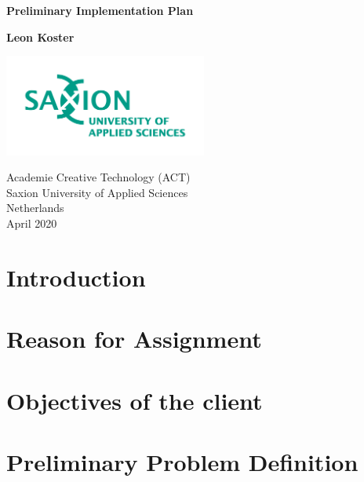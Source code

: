 \documentclass[]{article}
\begin{document}
\begin{titlepage}
   \begin{center}
       \vspace*{1cm}

       \textbf{Preliminary Implementation Plan}

       \vspace{0.5cm}
            
       \vspace{1.5cm}

       \textbf{Leon Koster}

       \vfill
            
       \vspace{0.8cm}
     
      \includegraphics[width=0.5\textwidth]{university}
            
       Academie Creative Technology (ACT)\\
       Saxion University of Applied Sciences\\
       Netherlands\\
       April 2020
            
   \end{center}
\end{titlepage}

\section{Introduction}
\section{Reason for Assignment}
\section{Objectives of the client}
\section{Preliminary Problem Definition}
\end{document}
